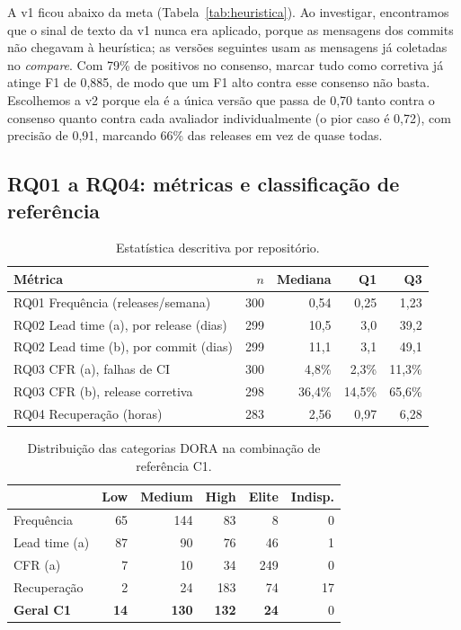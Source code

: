\documentclass[12pt]{article}
\begin{document}
A v1 ficou abaixo da meta (Tabela~\ref{tab:heuristica}). Ao investigar, encontramos que o sinal de texto da v1 nunca era aplicado, porque as mensagens dos commits não chegavam à heurística; as versões seguintes usam as mensagens já coletadas no \textit{compare}. Com 79\% de positivos no consenso, marcar tudo como corretiva já atinge F1 de 0,885, de modo que um F1 alto contra esse consenso não basta. Escolhemos a v2 porque ela é a única versão que passa de 0,70 tanto contra o consenso quanto contra cada avaliador individualmente (o pior caso é 0,72), com precisão de 0,91, marcando 66\% das releases em vez de quase todas.

\subsection{RQ01 a RQ04: métricas e classificação de referência}

\begin{table}[ht]
\centering
\caption{Estatística descritiva por repositório.}\label{tab:descritivas}
\small
\begin{tabular}{lrrrr}
\toprule
Métrica & $n$ & Mediana & Q1 & Q3 \\
\midrule
RQ01 Frequência (releases/semana) & 300 & 0,54 & 0,25 & 1,23 \\
RQ02 Lead time (a), por release (dias) & 299 & 10,5 & 3,0 & 39,2 \\
RQ02 Lead time (b), por commit (dias) & 299 & 11,1 & 3,1 & 49,1 \\
RQ03 CFR (a), falhas de CI & 300 & 4,8\% & 2,3\% & 11,3\% \\
RQ03 CFR (b), release corretiva & 298 & 36,4\% & 14,5\% & 65,6\% \\
RQ04 Recuperação (horas) & 283 & 2,56 & 0,97 & 6,28 \\
\bottomrule
\end{tabular}
\end{table}

\begin{table}[ht]
\centering
\caption{Distribuição das categorias DORA na combinação de referência C1.}\label{tab:c1}
\small
\begin{tabular}{lrrrrr}
\toprule
 & Low & Medium & High & Elite & Indisp. \\
\midrule
Frequência & 65 & 144 & 83 & 8 & 0 \\
Lead time (a) & 87 & 90 & 76 & 46 & 1 \\
CFR (a) & 7 & 10 & 34 & 249 & 0 \\
Recuperação & 2 & 24 & 183 & 74 & 17 \\
\textbf{Geral C1} & \textbf{14} & \textbf{130} & \textbf{132} & \textbf{24} & 0 \\
\bottomrule
\end{tabular}
\end{table}
\end{document}
